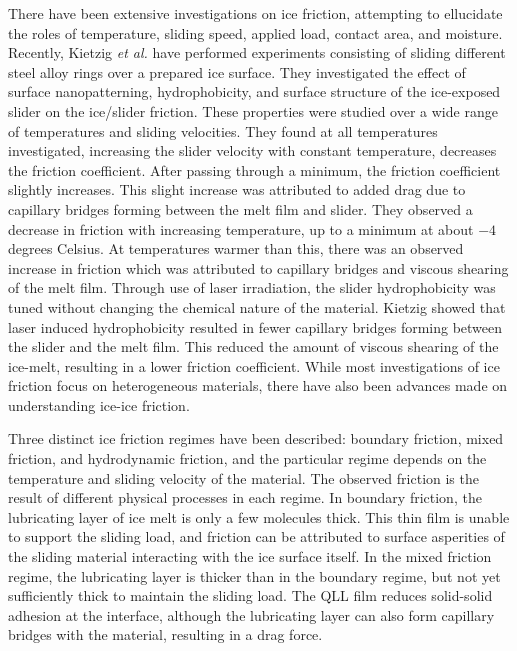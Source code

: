 There have been extensive investigations on ice friction, attempting
to ellucidate the roles of
temperature\cite{Roberts1981,Higgins2008,Bowden1939,Evans1976,Derjaguin1988,Liang2003},
sliding speed\cite{Evans1976,Derjaguin1988,Liang2003}, applied
load\cite{Buhl2001,Bowden1939,Derjaguin1988,Baurle2006,Oksanen1982},
contact area\cite{Bowden1939,Baurle2007}, and
moisture\cite{Calabrese1980}. Recently, Kietzig \textit{et al.} have
performed experiments consisting of sliding different steel alloy
rings over a prepared ice surface.\cite{Kietzig2009} They investigated
the effect of surface nanopatterning, hydrophobicity, and surface
structure of the ice-exposed slider on the ice/slider friction.  These
properties were studied over a wide range of temperatures and sliding
velocities. They found at all temperatures investigated, increasing
the slider velocity with constant temperature, decreases the friction
coefficient. After passing through a minimum, the friction coefficient
slightly increases. This slight increase was attributed to added drag
due to capillary bridges forming between the melt film and
slider. They observed a decrease in friction with increasing
temperature, up to a minimum at about $-4$ degrees Celsius. At
temperatures warmer than this, there was an observed increase in
friction which was attributed to capillary bridges and viscous
shearing of the melt film.  Through use of laser irradiation, the
slider hydrophobicity was tuned without changing the chemical nature
of the material. Kietzig showed that laser induced hydrophobicity
resulted in fewer capillary bridges forming between the slider and the
melt film. This reduced the amount of viscous shearing of the
ice-melt, resulting in a lower friction coefficient.
While most investigations of ice friction focus on heterogeneous
materials\cite{Bowden1939,Evans1976,Derjaguin1988,Liang2003,Liang2005,Baurle2006,Baurle2007,Kietzig2009,Kietzig2010},
there have also been advances made on understanding ice-ice friction\cite{Oksanen1982,Kennedy2000,Maeno2004,Fortt2007,Fortt2011,Lishman2011,Samadashvili2013}.


Three distinct ice friction regimes have been described:
boundary friction, mixed friction, and hydrodynamic friction, and the
particular regime depends on the temperature and sliding velocity of
the
material.\cite{Bhushan2002,Kietzig2009,Kietzig2010,Persson2015,Tuononen2016}
The observed friction is the result of different physical processes in
each regime. In boundary friction, the lubricating layer of ice melt
is only a few molecules thick. This thin film is unable to support the
sliding load, and friction can be attributed to surface asperities of
the sliding material interacting with the ice surface
itself.\cite{Bhushan2002} In the mixed friction regime, the
lubricating layer is thicker than in the boundary regime, but not yet
sufficiently thick to maintain the sliding load. The QLL film reduces
solid-solid adhesion at the interface, although the lubricating layer
can also form capillary bridges with the material, resulting in a drag
force.\cite{Kietzig2009,Kietzig2010}

